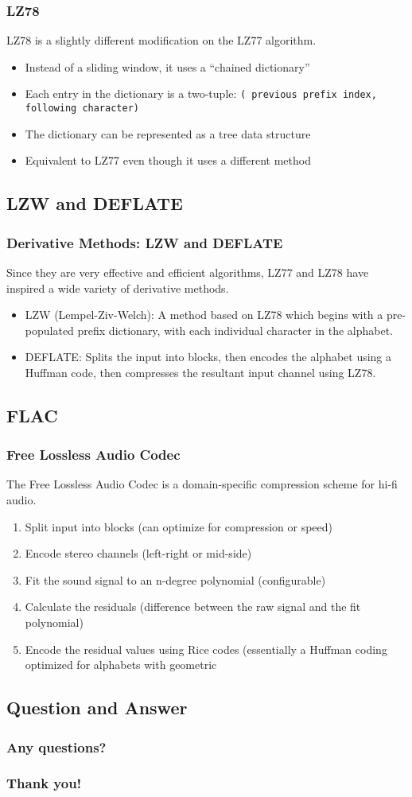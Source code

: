 \documentclass[mathserif,notheorems]{beamer} %
\begin{document}
\begin{frame}
  \frametitle{LZ78}
  LZ78 is a slightly different modification on the LZ77 algorithm.
  \begin{itemize}
  \item Instead of a sliding window, it uses a ``chained dictionary''
  \item Each entry in the dictionary is a two-tuple: \texttt{(
      previous prefix index, following character)}
  \item The dictionary can be represented as a tree data structure
  \item Equivalent to LZ77 even though it uses a different method
  \end{itemize}
\end{frame}

\begin{frame}
  \subsection{LZW and DEFLATE}
  \frametitle{Derivative Methods: LZW and DEFLATE}

  Since they are very effective and efficient algorithms, LZ77 and
  LZ78 have inspired a wide variety of derivative methods.

  \begin{itemize}
  \item LZW (Lempel-Ziv-Welch): A method based on LZ78 which begins
    with a pre-populated prefix dictionary, with each individual
    character in the alphabet.
  \item DEFLATE: Splits the input into blocks, then encodes the
    alphabet using a Huffman code, then compresses the resultant input
    channel using LZ78.
  \end{itemize}
\end{frame}

\begin{frame}
  \section{FLAC}
  \frametitle{Free Lossless Audio Codec}
  The Free Lossless Audio Codec is a domain-specific compression
  scheme for hi-fi audio.
  \begin{enumerate}
  \item Split input into blocks (can optimize for compression or
    speed)
  \item Encode stereo channels (left-right or mid-side)
  \item Fit the sound signal to an n-degree polynomial (configurable)
  \item Calculate the residuals (difference between the raw signal and
    the fit polynomial)
  \item Encode the residual values using Rice codes (essentially a
    Huffman coding optimized for alphabets with geometric
  \end{enumerate}
\end{frame}

\begin{frame}
  \section{Question and Answer}
  \frametitle{Any questions?}
\end{frame}

\begin{frame}
  \frametitle{Thank you!}
\end{frame}
\end{document}
